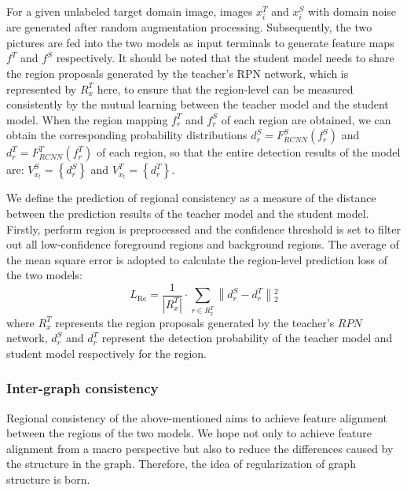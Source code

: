 \documentclass[sn-mathphys]{sn-jnl}%
\theoremstyle{thmstyleone}%
\theoremstyle{thmstyletwo}%
\theoremstyle{thmstylethree}%
\begin{document}
For a given unlabeled target domain image, images $x_{i}^{T}$ and $x_{i}^{S}$ with domain noise are generated after random augmentation processing. Subsequently, the two pictures are fed into the two models as input terminals to generate feature maps ${{f}^{T}}$ and ${{f}^{S}}$ respectively. It should be noted that the student model needs to share the region proposals generated by the teacher’s RPN network, which is represented by $R_{x}^{T}$ here, to ensure that the region-level can be measured consistently by the mutual learning between the teacher model and the student model. When the region mapping $f_{r}^{T}$ and $f_{r}^{S}$ of each region are obtained, we can obtain the corresponding probability distributions $d_{r}^{S}=F_{RCNN}^{S}(f_{r}^{S})$ and $d_{r}^{T}=F_{RCNN}^{T}(f_{r}^{T})$ of each region, so that the entire detection results of the model are: $V_{{{x}_{t}}}^{S}=\left\{ d_{r}^{S} \right\}$ and $V_{{{x}_{t}}}^{T}=\left\{ d_{r}^{T} \right\}$.

We define the prediction of regional consistency as a measure of the distance between the prediction results of the teacher model and the student model. Firstly, perform region is preprocessed and the confidence threshold is set to filter out all low-confidence foreground regions and background regions. The average of the mean square error is adopted to calculate the region-level prediction loss of the two models: 
\begin{equation}
{{L}_{\operatorname{Re}}}=\frac{1}{\left\vert R_{x}^{T} \right\vert}\cdot \sum\limits_{r\in R_{x}^{T}}{\left\| d_{r}^{S}-d_{r}^{T}\right.}\left\| _{2}^{2} \right.
\label{eq:05}
\end{equation}
where $R_{x}^{T}$ represents the region proposals generated by the teacher’s $RPN$ network,  $d_{r}^{S}$ and $d_{r}^{T}$ represent the detection probability of the teacher model and student model respectively for the region.

%
%
\subsubsection{Inter-graph consistency}

Regional consistency of the above-mentioned aims to achieve feature alignment between the regions of the two models. We hope not only to achieve feature alignment from a macro perspective but also to reduce the differences caused by the structure in the graph. Therefore, the idea of regularization of graph structure is born.
\end{document}
